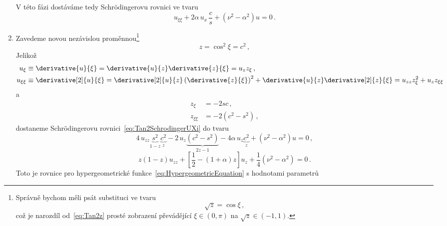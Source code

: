 \begin{solution}
\begin{enumerate}
		V této fázi dostáváme tedy Schrödingerovu rovnici ve tvaru
		\begin{equation}
		\label{eq:Tan2SchrodingerUXi}
			u_{\xi\xi}
				+2\alpha\,u_{x}\,\frac{c}{s}
				+\left(\nu^{2}-\alpha^{2}\right)u=0\,.
		\end{equation}		
		
	\item
		Zavedeme novou nezávislou proměnnou\footnote{
			Správně bychom měli psát substituci ve tvaru
			\begin{equation}
				\sqrt{z}=\cos\xi\,,
			\end{equation}
			což je narozdíl od~\eqref{eq:Tan2z} prosté zobrazení převádějící $\xi\in(0,\pi)$
			na $\sqrt{z}\in(-1,1)$.
		}
		\begin{equation}
			\label{eq:Tan2z}
			z=\cos^{2}\xi=c^{2}\,,
		\end{equation}
		Jelikož
		\begin{subequations}
			\begin{align}
				u_{\xi}
					&\equiv\derivative{u}{\xi}=\derivative{u}{z}\derivative{z}{\xi}=u_{z}z_{\xi}\,,\\
				u_{\xi\xi}
					&\equiv\derivative[2]{u}{\xi}=\derivative[2]{u}{z}\left(\derivative{z}{\xi}\right)^{2}+\derivative{u}{z}\derivative[2]{z}{\xi}
						=u_{zz}z_{\xi}^{2}+u_{z}z_{\xi\xi}
			\end{align}				
		\end{subequations}
		a
		\begin{subequations}
			\begin{align}
				z_{\xi}&=-2sc\,,\\
				z_{\xi\xi}&=-2\left(c^{2}-s^{2}\right)\,,
			\end{align}				
		\end{subequations}
		dostaneme Schrödingerovu rovnici~\eqref{eq:Tan2SchrodingerUXi} do tvaru
		\begin{equation}
			4\,u_{zz}\underbrace{s^{2}}_{1-z}\underbrace{c^{2}}_{z}
				-2\,u_{z}\underbrace{\left(c^{2}-s^{2}\right)}_{2z-1}
				-4\alpha\,u_{z}\underbrace{c^{2}}_{z}
				+\left(\nu^{2}-\alpha^{2}\right)u=0\,,
		\end{equation}
		\begin{equation}
			\label{eq:Tan2SchrodingerFinal}
			z(1-z)u_{zz}
				+\left[\frac{1}{2}-\left(1+\alpha\right)z\right]u_{z}
				+\frac{1}{4}\left(\nu^{2}-\alpha^{2}\right)=0\,.
		\end{equation}
		Toto je rovnice pro hypergeometrické funkce~\eqref{eq:HypergeometricEquation} s hodnotami
		parametrů

\end{enumerate}
\end{solution}
